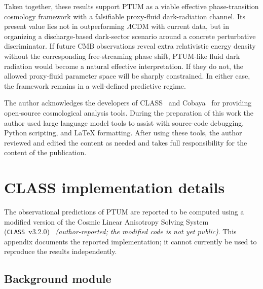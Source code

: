 \documentclass[epj]{svjour}
\begin{document}
Taken together, these results support PTUM as a viable effective
phase-transition cosmology framework with a falsifiable proxy-fluid
dark-radiation channel. Its present value lies not in outperforming
$\Lambda$CDM with current data, but in organizing a discharge-based dark-sector
scenario around a concrete perturbative discriminator. If future CMB
observations reveal extra relativistic energy density without the corresponding
free-streaming phase shift, PTUM-like fluid dark radiation would become a
natural effective interpretation. If they do not, the allowed proxy-fluid
parameter space will be sharply constrained. In either case, the framework
remains in a well-defined predictive regime.

\begin{acknowledgement}
The author acknowledges the developers of
CLASS~\cite{Blas2011,Lesgourgues2011} and
Cobaya~\cite{Torrado2021} for providing open-source cosmological
analysis tools. During the preparation of this work the author used
large language model tools to assist with source-code debugging,
Python scripting, and \LaTeX{} formatting. After using these tools,
the author reviewed and edited the content as needed and takes full
responsibility for the content of the publication.
\end{acknowledgement}


\appendix

\appendix

\section{CLASS implementation details}
\label{app:class}

The observational predictions of PTUM are reported to be computed
using a modified version of the Cosmic Linear Anisotropy Solving
System (\texttt{CLASS}~v3.2.0)~\cite{Blas2011} \emph{(author-reported;
the modified code is not yet public)}. This appendix documents the
reported implementation; it cannot currently be used to reproduce the
results independently.

\subsection{Background module}
\end{document}
